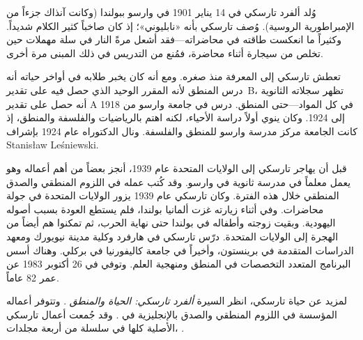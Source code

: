 \documentclass[../../../include/open-logic-section]{subfiles}
\begin{document}



وُلد ألفرد تارسكي في 14 يناير 1901 في وارسو ببولندا (وكانت آنذاك جزءاً
من الإمبراطورية الروسية). وُصف تارسكي بأنه «نابليوني»؛ إذ كان صاخباً
كثير الكلام شديداً. وكثيراً ما انعكست طاقته في محاضراته---فقد أشعل مرةً
النار في سلة مهملات حين تخلص من سيجارة أثناء محاضرة، فمُنع من التدريس في
ذلك المبنى مرة أخرى.

تعطش تارسكي إلى المعرفة منذ صغره. ومع أنه كان يخبر طلابه في أواخر حياته
أنه درس المنطق لأنه المقرر الوحيد الذي حصل فيه على تقدير~B، تظهر سجلاته
الثانوية أنه حصل على تقدير A في كل المواد---حتى المنطق. درس في جامعة
وارسو من 1918 إلى 1924. وكان ينوي أولاً دراسة الأحياء، لكنه اهتم
بالرياضيات والفلسفة والمنطق، إذ كانت الجامعة مركز مدرسة وارسو للمنطق
والفلسفة. ونال الدكتوراه عام 1924 بإشراف
Stanis\l{}aw Le\'{s}niewski.

قبل أن يهاجر تارسكي إلى الولايات المتحدة عام 1939، أنجز بعضاً من أهم
أعماله وهو يعمل معلماً في مدرسة ثانوية في وارسو. وقد كُتب عمله في اللزوم
المنطقي والصدق المنطقي خلال هذه الفترة. وكان تارسكي عام 1939 يزور الولايات
المتحدة في جولة محاضرات. وفي أثناء زيارته غزت ألمانيا بولندا، فلم يستطع
العودة بسبب أصوله اليهودية. وبقيت زوجته وأطفاله في بولندا حتى نهاية
الحرب، ثم تمكنوا هم أيضاً من الهجرة إلى الولايات المتحدة. درّس تارسكي في
هارفرد وكلية مدينة نيويورك ومعهد الدراسات المتقدمة في برينستون، وأخيراً
في جامعة كاليفورنيا في بركلي. وهناك أسس البرنامج المتعدد التخصصات في
المنطق ومنهجية العلم. وتوفي في 26 أكتوبر 1983 عن عمر 82 عاماً.

\begin{reading}
لمزيد عن حياة تارسكي، انظر السيرة \emph{ألفرد تارسكي: الحياة والمنطق}
\citep{Feferman2004}. وتتوفر أعماله المؤسسة في اللزوم المنطقي والصدق
بالإنجليزية في \citep{Tarski1983}. وقد جُمعت أعمال تارسكي الأصلية كلها
في سلسلة من أربعة مجلدات، \citep{Tarski1981}.
\end{reading}
\end{document}
